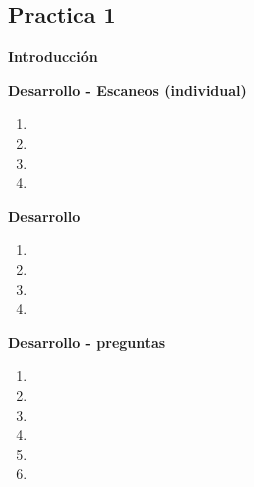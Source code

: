 \documentclass[11pt,letterpaper]{article}
\begin{document}
	
    
    
    \begin{center}
	\section*{\LARGE{Practica 1}}
    \end{center}

    \begin{center}
        \LARGE{\textbf{Introducción}}\\
    \end{center}
    \normalsize
    

    \newpage
    \begin{center}
        \LARGE{\textbf{Desarrollo - Escaneos (individual)}}\\
    \end{center}
    \normalsize
    \begin{enumerate}
        \item 
        \item 
        \item 
        \item 
    \end{enumerate}

    \newpage
    \begin{center}
        \LARGE{\textbf{Desarrollo }}\\
    \end{center}
    \normalsize
    \begin{enumerate}
        \item 
        \item 
        \item 
        \item 
    \end{enumerate}
    
    \newpage
    \begin{center}
        \LARGE{\textbf{Desarrollo - preguntas}}\\
    \end{center}
    \normalsize
    \begin{enumerate}
        \item 
        \item 
        \item 
        \item 
        \item 
        \item 
    \end{enumerate}
\end{document}
